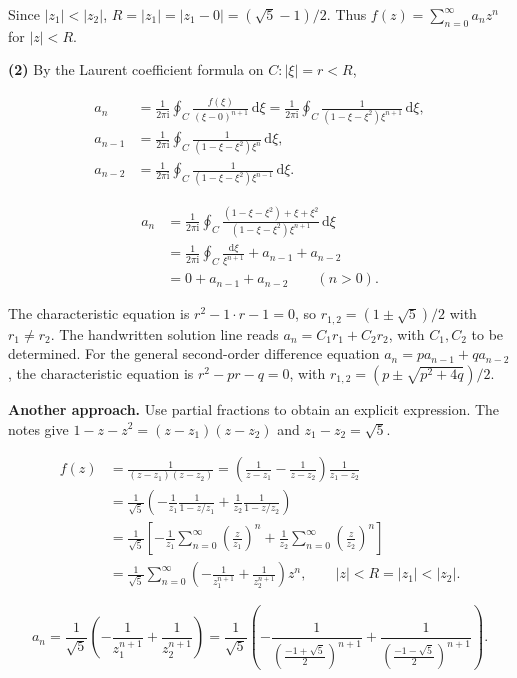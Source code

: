 \documentclass[11pt,a4paper]{article}
\theoremstyle{definition}
\theoremstyle{plain}
\begin{document}
Since $|z_1|<|z_2|$, $R=|z_1|=|z_1-0|=(\sqrt5-1)/2$. Thus $f(z)=\sum_{n=0}^{\infty}a_nz^n$ for $|z|<R$.

\textbf{(2)} By the Laurent coefficient formula on $C:|\xi|=r<R$,

\[
\begin{aligned}
a_n&=\frac1{2\pi \mathrm{i}}\oint_C\frac{f(\xi)}{(\xi-0)^{n+1}}\,\mathrm{d}\xi
=\frac1{2\pi \mathrm{i}}\oint_C\frac1{(1-\xi-\xi^2)\xi^{n+1}}\,\mathrm{d}\xi,\\
a_{n-1}&=\frac1{2\pi \mathrm{i}}\oint_C\frac1{(1-\xi-\xi^2)\xi^n}\,\mathrm{d}\xi,\\
a_{n-2}&=\frac1{2\pi \mathrm{i}}\oint_C\frac1{(1-\xi-\xi^2)\xi^{n-1}}\,\mathrm{d}\xi.
\end{aligned}
\]

\[
\begin{aligned}
a_n&=\frac1{2\pi \mathrm{i}}\oint_C
\frac{(1-\xi-\xi^2)+\xi+\xi^2}{(1-\xi-\xi^2)\xi^{n+1}}\,\mathrm{d}\xi\\
&=\frac1{2\pi \mathrm{i}}\oint_C\frac{\mathrm{d}\xi}{\xi^{n+1}}+a_{n-1}+a_{n-2}\\
&=0+a_{n-1}+a_{n-2}\qquad(n>0).
\end{aligned}
\]

The characteristic equation is $r^2-1\cdot r-1=0$, so $r_{1,2}=(1\pm\sqrt5)/2$ with $r_1\ne r_2$. The handwritten solution line reads $a_n=C_1r_1+C_2r_2$, with $C_1,C_2$ to be determined. For the general second-order difference equation $a_n=pa_{n-1}+qa_{n-2}$, the characteristic equation is $r^2-pr-q=0$, with $r_{1,2}=(p\pm\sqrt{p^2+4q})/2$.

\textbf{Another approach.} Use partial fractions to obtain an explicit expression. The notes give $1-z-z^2=(z-z_1)(z-z_2)$ and $z_1-z_2=\sqrt5$.

\[
\begin{aligned}
f(z)&=\frac1{(z-z_1)(z-z_2)}
=\left(\frac1{z-z_1}-\frac1{z-z_2}\right)\frac1{z_1-z_2}\\
&=\frac1{\sqrt5}\left(-\frac1{z_1}\frac1{1-z/z_1}
+\frac1{z_2}\frac1{1-z/z_2}\right)\\
&=\frac1{\sqrt5}\left[-\frac1{z_1}\sum_{n=0}^\infty\left(\frac z{z_1}\right)^n
+\frac1{z_2}\sum_{n=0}^\infty\left(\frac z{z_2}\right)^n\right]\\
&=\frac1{\sqrt5}\sum_{n=0}^\infty
\left(-\frac1{z_1^{n+1}}+\frac1{z_2^{n+1}}\right)z^n,
\qquad |z|<R=|z_1|<|z_2|.
\end{aligned}
\]

\[
a_n=\frac1{\sqrt5}\left(-\frac1{z_1^{n+1}}+\frac1{z_2^{n+1}}\right)
=\frac1{\sqrt5}\left(-\frac1{\left(\frac{-1+\sqrt5}2\right)^{n+1}}
+\frac1{\left(\frac{-1-\sqrt5}2\right)^{n+1}}\right).
\]
\end{document}
